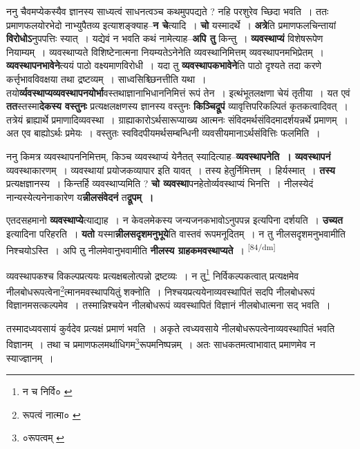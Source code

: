 \documentclass[article,12pt,a4paper]{memoir}
\begin{document}
	  \pstart ननु चैवमप्येकस्यैव ज्ञानस्य साध्यत्वं साधनत्वञ्च कथमुपपद्यते ? नहि परशुरेव च्छिदा भवति । ततः प्रमाणफलयोरभेदो नाभ्युपैतव्य इत्याशङ्क्याह--\textbf{न चे}त्यादि । \textbf{चो} यस्मादर्थे । \textbf{अत्रे}ति प्रमाणफलचिन्तायां \textbf{विरोधोऽ}नुपपत्तिः स्यात् । यद्येवं न भवति कथं नामेत्याह--\textbf{अपि तु} किन्तु । \textbf{व्यवस्थाप्यं} विशेषरूपेण नियाम्यम् । व्यवस्थाप्यते विशिष्टेनात्मना नियम्यतेऽनेनेति व्यवस्थानिमित्तम् व्यवस्थापनमभिप्रेतम् । \textbf{व्यवस्थापनभावेने}त्ययं पाठो वक्ष्यमाणविरोधी । यदा तु \textbf{व्यवस्थापकभावेने}ति पाठो दृश्यते तदा करणे कर्त्तृभावविवक्षया तथा द्रष्टव्यम् । साध्वसिश्च्छिनत्तीति यथा । तयो\textbf{र्व्यवस्थाप्यव्यवस्थापनयोर्भा}वस्तथाज्ञानाभिधाननिमित्तं रूपं तेन । इत्थंभूतलक्षणा चेयं तृतीया । यत एवं \textbf{तत}स्तस्मा\textbf{देकस्य वस्तुनः} प्रत्यक्षलक्षणस्य ज्ञानस्य वस्तुनः \textbf{किञ्चिद्रूपं} व्यावृत्तिपरिकल्पितं कृतकत्वादिवत् । तत्रेयं ब्राह्यार्थे प्रमाणादिव्यवस्था । ग्राह्याकारोऽर्थसारूप्याख्य आत्मनः संविदमर्थसंविदमादर्शयन्नर्थे प्रमाणम् । अत एव बाह्योऽर्थः प्रमेयः । वस्तुतः स्वविदपीयमर्थसम्बन्धिनी व्यवसीयमानाऽर्थसंवित्तिः फलमिति ।
	\pend
      

	  \pstart ननु किमत्र व्यवस्थापननिमित्तम्, किञ्च व्यवस्थाप्यं येनैतत् स्यादित्याह--\textbf{व्यवस्थापनेति । व्यवस्थापनं} व्यवस्थाकारणम् । व्यवस्थायां प्रयोजकव्यापार इति यावत् । तस्य हेतुर्निमित्तम् । हिर्यस्मात् । \textbf{तस्य} प्रत्यक्षज्ञानस्य । किन्तर्हि व्यवस्थाप्यमिति ? \textbf{चो व्यवस्था}पनहेतोर्व्यवस्थाप्यं भिनत्ति । नीलस्येदं नान्यस्येत्यनेनाकारेण य\textbf{न्नीलसंवेदनं} त\textbf{द्रूपम् ।}
	\pend
      

	  \pstart एतदसहमानो \textbf{व्यवस्थाप्ये}त्याद्याह । न केवलमेकस्य जन्यजनकभावोऽनुपपन्न इत्यपिना दर्शयति । \textbf{उच्यत} इत्यादिना परिहरति । \textbf{यतो} यस्मा\textbf{न्नीलसदृशमनुभूये}ति वास्तवं रूपमनूदितम् । न तु नीलसदृशमनुभवामीति निश्चयोऽस्ति । अपि तु नीलमेवानुभवामीति \textbf{नीलस्य ग्राहकमवस्थाप्यते} ।
	\pend
      \leavevmode\textsuperscript{\rmlatinfont\tiny [84/dm]}

	  \pstart व्यवस्थापकश्च विकल्पप्रत्ययः प्रत्यक्षबलोत्पन्नो द्रष्टव्यः । न तु\footnote{न च निर्वि० \cite{dp-msC}} निर्विकल्पकत्वात् प्रत्यक्षमेव नीलबोधरूपत्वेना\footnote{रूपत्वं नात्मा० \cite{dp-msC}}त्मानमवस्थापयितुं शक्नोति । निश्चयप्रत्ययेनाव्यवस्थापितं सदपि नीलबोधरूपं विज्ञानमसत्कल्पमेव । तस्मान्निश्चयेन नीलबोधरूपं व्यवस्थापितं विज्ञानं नीलबोधात्मना सद् भवति ।
	\pend
       

	  \pstart तस्मादध्यवसायं कुर्वदेव प्रत्यक्षं प्रमाणं भवति । अकृते त्वध्यवसाये नीलबोधरूपत्वेनाव्यवस्थापितं भवति विज्ञानम् । तथा च प्रमाणफलमर्थाधिगम\footnote{०रूपत्वम् \cite{dp-msA} \cite{dp-msC} \cite{dp-msD} \cite{dp-edP} \cite{dp-edH} \cite{dp-edE}}रूपमनिष्पन्नम् । अतः साधकतमत्वाभावात् प्रमाणमेव न स्याज्ज्ञानम् ।
	\pend
      
\end{document}
